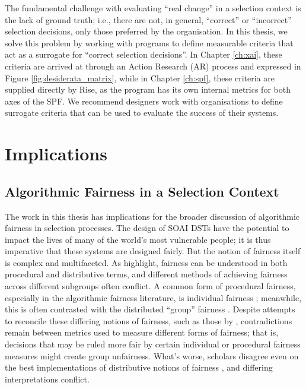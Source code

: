 The fundamental challenge with evaluating ``real change'' in a selection context is the lack of ground truth; i.e., there are not, in general, ``correct'' or ``incorrect'' selection decisions, only those preferred by the organisation. In this thesis, we solve this problem by working with programs to define measurable criteria that act as a surrogate for ``correct selection decisions''. In Chapter \ref{ch:xai}, these criteria are arrived at through an Action Research (AR) process and expressed in Figure \ref{fig:desiderata_matrix}, while in Chapter \ref{ch:spf}, these criteria are supplied directly by Rise, as the program has its own internal metrics for both axes of the SPF. We recommend designers work with organisations to define surrogate criteria that can be used to evaluate the success of their systems.

\section{Implications}
\subsection{Algorithmic Fairness in a Selection Context}
The work in this thesis has implications for the broader discussion of algorithmic fairness in selection processes. The design of SOAI DSTs have the potential to impact the lives of many of the world's most vulnerable people; it is thus imperative that these systems are designed fairly. But the notion of fairness itself is complex and multifaceted. As \textcite{pmlr-v80-kearns18a} highlight, fairness can be understood in both procedural and distributive terms, and different methods of achieving fairness across different subgroups often conflict. A common form of procedural fairness, especially in the algorithmic fairness literature, is individual fairness \cite{dwork_fairness_2012}; meanwhile, this is often contrasted with the distributed ``group'' fairness \cite{fleisher_whats_nodate,binns_apparent_2019,barocas2023fairness,Friedler_Scheidegger_Venkatasubramanian_2016}. Despite attempts to reconcile these differing notions of fairness, such as those by \textcite{binns_apparent_2019}, contradictions remain between metrics used to measure different forms of fairness; that is, decisions that may be ruled more fair by certain individual or procedural fairness measures might create group unfairness. What's worse, scholars disagree even on the best implementations of distributive notions of fairness \cite{Friedler_Scheidegger_Venkatasubramanian_2016}, and differing interpretations conflict. 

